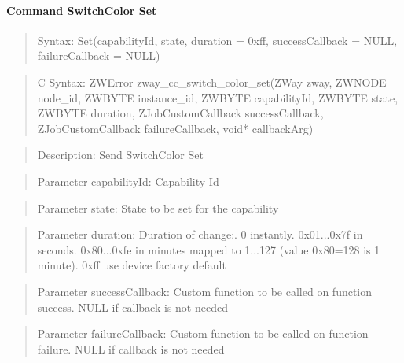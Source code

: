 \paragraph{Command SwitchColor Set}
\begin{quote}Syntax: Set(capabilityId, state, duration = 0xff, successCallback = NULL, failureCallback = NULL)\end{quote}
\begin{quote}C Syntax: ZWError zway\_cc\_switch\_color\_set(ZWay zway, ZWNODE node\_id, ZWBYTE instance\_id, ZWBYTE capabilityId, ZWBYTE state, ZWBYTE duration, ZJobCustomCallback successCallback, ZJobCustomCallback failureCallback, void* callbackArg)\end{quote}
\begin{quote}Description: Send SwitchColor Set\end{quote}
\begin{quote}Parameter capabilityId: Capability Id\end{quote}
\begin{quote}Parameter state: State to be set for the capability\end{quote}
\begin{quote}Parameter duration: Duration of change:. 0 instantly. 0x01...0x7f in seconds. 0x80...0xfe in minutes mapped to 1...127 (value 0x80=128 is 1 minute). 0xff use device factory default\end{quote}
\begin{quote}Parameter successCallback: Custom function to be called on function success. NULL if callback is not needed\end{quote}
\begin{quote}Parameter failureCallback: Custom function to be called on function failure. NULL if callback is not needed\end{quote}


